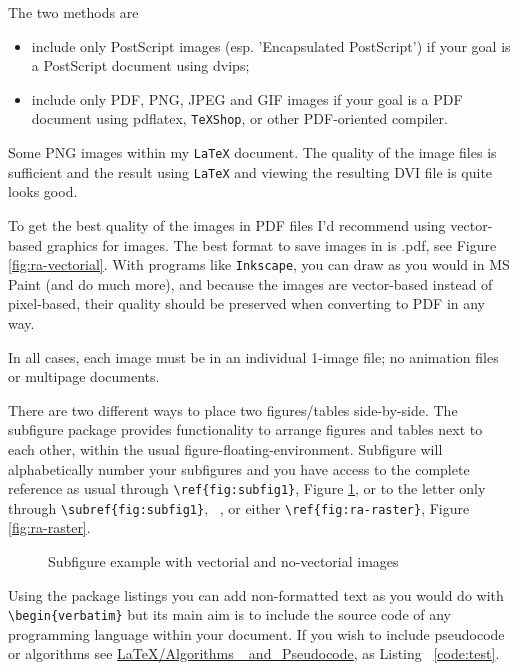The two methods are

\begin{itemize}
\item  include only PostScript images (esp. 'Encapsulated PostScript') if your goal is a PostScript document using dvips;
\item include only PDF, PNG, JPEG and GIF images if your goal is a PDF document using pdflatex, \texttt{TeXShop}, or other PDF-oriented compiler. 
\end{itemize}

Some PNG images within my \texttt{LaTeX} document. The quality of the image files is sufficient and the result using \texttt{LaTeX} and viewing the resulting DVI file is quite looks good.

To get the best quality of the images in  PDF files I'd recommend using vector-based graphics for images. The best format to save images in is .pdf, see Figure \ref{fig:ra-vectorial}. With programs like \texttt{Inkscape}, you can draw as you would in MS Paint (and do much more), and because the images are vector-based instead of pixel-based, their quality should be preserved when converting to PDF in any way.    

In all cases, each image must be in an individual 1-image file; no animation files or multipage documents. 

There are two different ways to place two figures/tables side-by-side. The subfigure package provides functionality to arrange figures and tables next to each other, within the usual figure-floating-environment. Subfigure will alphabetically number your subfigures and you have access to the complete reference as usual through \verb!\ref{fig:subfig1}!, Figure \ref{fig:figura-completa}, or to the letter only through \verb!\subref{fig:subfig1}!, ~, or either \verb!\ref{fig:ra-raster}!, Figure \ref{fig:ra-raster}.

\begin{figure}[htbp]
	\centering
\qquad\qquad
  \caption{Subfigure example with vectorial and no-vectorial images}
  \label{fig:figura-completa}
\end{figure}


Using the package listings you can add non-formatted text as you would do with \verb!\begin{verbatim}! but its main aim is to include the source code of any programming language within your document. If you wish to include pseudocode or algorithms see \href{http://en.wikibooks.org/wiki/LaTeX/Algorithms_and_Pseudocode}{LaTeX/Algorithms\_ and\_Pseudocode}, as Listing ~\ref{code:test}.

